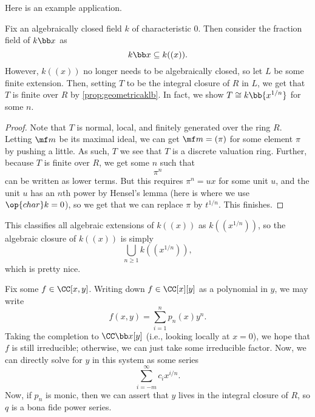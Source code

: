 Here is an example application.
\begin{exe}
	Fix an algebraically closed field $k$ of characteristic $0$. Then consider the fraction field of $k\bb x$ as
	\[k\bb x\subseteq k((x)).\]
	However, $k((x))$ no longer needs to be algebraically closed, so let $L$ be some finite extension. Then, setting $T$ to be the integral closure of $R$ in $L$, we get that $T$ is finite over $R$ by \autoref{prop:geometricaklb}. In fact, we show $T\cong k\bb{x^{1/n}}$ for some $n$.
\end{exe}
\begin{proof}
	Note that $T$ is normal, local, and finitely generated over the ring $R$. Letting $\mf m$ be its maximal ideal, we can get $\mf m=(\pi)$ for some element $\pi$ by pushing a little. As such, $T$ we see that $T$ is a discrete valuation ring. Further, because $T$ is finite over $R$, we get some $n$ such that
	\[\pi^n\]
	can be written as lower terms. But this requires $\pi^n=ux$ for some unit $u$, and the unit $u$ has an $n$th power by Hensel's lemma (here is where we use $\op{char}k=0$), so we get that we can replace $\pi$ by $t^{1/n}$. This finishes.
\end{proof}
\begin{remark}
	This classifies all algebraic extensions of $k((x))$ as $k((x^{1/n}))$, so the algebraic closure of $k((x))$ is simply
	\[\bigcup_{n\ge1}k((x^{1/n})),\]
	which is pretty nice.
\end{remark}
\begin{example}
	Fix some $f\in\CC[x,y]$. Writing down $f\in\CC[x][y]$ as a polynomial in $y$, we may write
	\[f(x,y)=\sum_{i=1}^np_n(x)y^n.\]
	Taking the completion to $\CC\bb x[y]$ (i.e., looking locally at $x=0$), we hope that $f$ is still irreducible; otherwise, we can just take some irreducible factor. Now, we can directly solve for $y$ in this system as some series
	\[\sum_{i=-m}^\infty c_ix^{i/n}.\]
	Now, if $p_n$ is monic, then we can assert that $y$ lives in the integral closure of $R$, so $q$ is a bona fide power series.
\end{example}

